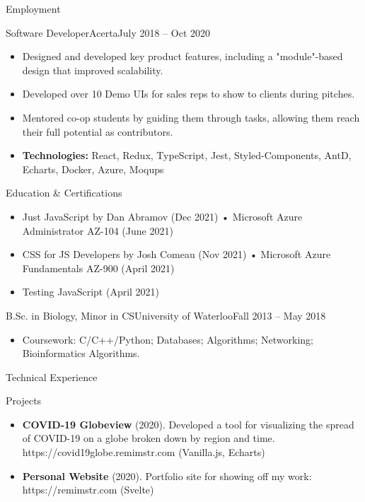 \documentclass[]{mcdowellcv}
\begin{document}
\begin{cvsection}{Employment}
		\begin{cvsubsection}{Software Developer}{Acerta}{July 2018 -- Oct 2020}
			\begin{itemize}
				\item Designed and developed key product features, including a "module"-based design that improved scalability.
				\item Developed over 10 Demo UIs for sales reps to show to clients during pitches.
				\item Mentored co-op students by guiding them through tasks, allowing them reach their full potential as contributors.
				\item \textbf{Technologies:} React, Redux, TypeScript, Jest, Styled-Components, AntD, Echarts, Docker, Azure, Moqups
			\end{itemize}
		\end{cvsubsection}

	\end{cvsection}

	\begin{cvsection}{Education \& Certifications}
		\begin{cvsubsection}{}{}{}
			\begin{itemize}
			    \item Just JavaScript by Dan Abramov (Dec 2021)  \hspace{1.41cm} • Microsoft Azure Administrator AZ-104 (June 2021)
			    \item CSS for JS Developers by Josh Comeau (Nov 2021) \hspace{0.25cm} • Microsoft Azure Fundamentals AZ-900 (April 2021)
				\item Testing JavaScript (April 2021)
			\end{itemize}
		\end{cvsubsection}
		\begin{cvsubsection}{B.Sc. in Biology, Minor in CS}{University of Waterloo}{Fall 2013 -- May 2018}
			\begin{itemize}
				\item Coursework: C/C++/Python; Databases; Algorithms; Networking; Bioinformatics Algorithms.
			\end{itemize}
		\end{cvsubsection}
	\end{cvsection}

	\begin{cvsection}{Technical Experience}
		\begin{cvsubsection}{Projects}{}{}
			\begin{itemize}
				\item \textbf{COVID-19 Globeview} (2020). Developed a tool for visualizing the spread of COVID-19 on a globe broken down by region and time.
					https://covid19globe.remimstr.com (Vanilla.js, Echarts)
				\item \textbf{Personal Website} (2020). Portfolio site for showing off my work: https://remimstr.com (Svelte)
			\end{itemize}
		\end{cvsubsection}
	\end{cvsection}
\end{document}
